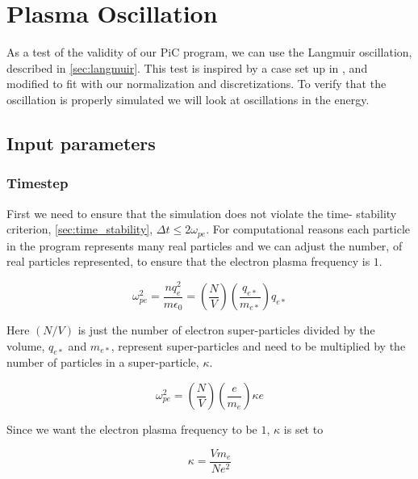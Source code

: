\section{Plasma Oscillation}
	\label{sec:langmuir_verification}
	As a test of the validity of our PiC program, we can use the Langmuir
	oscillation, described in \cref{sec:langmuir}.
	This test is inspired by a case set up in \citet{birdsall_plasma_2004},
	and modified to fit with our normalization and discretizations.
	To verify that the oscillation is properly simulated we will look at oscillations in the energy.


    \subsection{Input parameters}
        \subsubsection{Timestep}
        First we need to ensure that the simulation does not violate the time-
        stability criterion, \cref{sec:time_stability}, \(\Delta t \leq 2\omega_{pe}\).
        For computational reasons each particle in the program represents many real particles
        and we can adjust the number, of real particles represented, to ensure
        that the electron plasma frequency is \(1\).

        \begin{equation}
            \omega_{pe}^2 = \frac{nq^2_e}{m\epsilon_0} = \left(\frac{N}{V}\right)\left(\frac{q_{e*}}{m_{e*} }\right)q_{e*}
        \end{equation}

        Here \((N/V)\) is just the number of electron super-particles divided by the volume,
        \(q_{e*}\) and \(m_{e*}\), represent super-particles and need to be multiplied by the number
        of particles in a super-particle, \(\kappa\).

        \begin{equation}
            \omega_{pe}^2 = \left(\frac{N}{V}\right)\left(\frac{e}{m_e}\right)\kappa e
        \end{equation}

        Since we want the electron plasma frequency to be \(1\), \(\kappa\) is set to

        \begin{equation}
            \kappa = \frac{Vm_e}{Ne^2}
        \end{equation}

